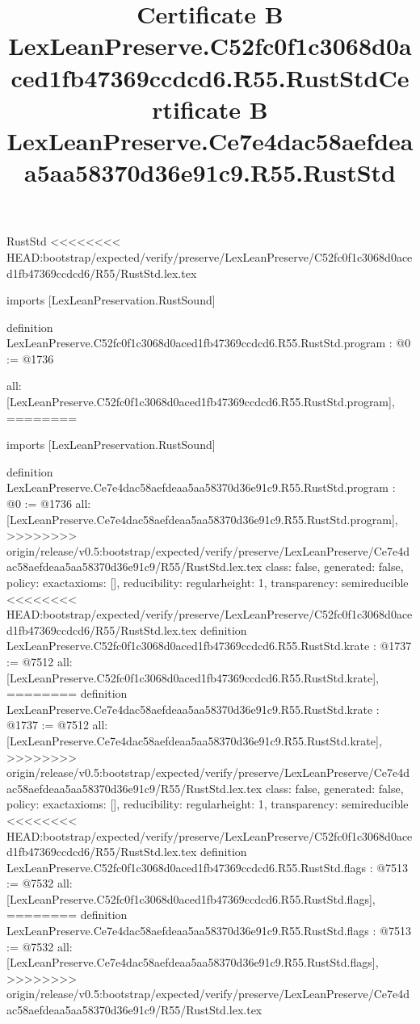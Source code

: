 \begin{lexlean}{RustStd}
<<<<<<<< HEAD:bootstrap/expected/verify/preserve/LexLeanPreserve/C52fc0f1c3068d0aced1fb47369ccdcd6/R55/RustStd.lex.tex
\title{Certificate B LexLeanPreserve.C52fc0f1c3068d0aced1fb47369ccdcd6.R55.RustStd}
\begin{coremodule}
imports [LexLeanPreservation.RustSound]

definition LexLeanPreserve.C52fc0f1c3068d0aced1fb47369ccdcd6.R55.RustStd.program : @0 := @1736 {
  all: [LexLeanPreserve.C52fc0f1c3068d0aced1fb47369ccdcd6.R55.RustStd.program],
========
\title{Certificate B LexLeanPreserve.Ce7e4dac58aefdeaa5aa58370d36e91c9.R55.RustStd}
\begin{coremodule}
imports [LexLeanPreservation.RustSound]

definition LexLeanPreserve.Ce7e4dac58aefdeaa5aa58370d36e91c9.R55.RustStd.program : @0 := @1736 {
  all: [LexLeanPreserve.Ce7e4dac58aefdeaa5aa58370d36e91c9.R55.RustStd.program],
>>>>>>>> origin/release/v0.5:bootstrap/expected/verify/preserve/LexLeanPreserve/Ce7e4dac58aefdeaa5aa58370d36e91c9/R55/RustStd.lex.tex
  class: false,
  generated: false,
  policy: exact{axioms: []},
  reducibility: regular{height: 1},
  transparency: semireducible
}
<<<<<<<< HEAD:bootstrap/expected/verify/preserve/LexLeanPreserve/C52fc0f1c3068d0aced1fb47369ccdcd6/R55/RustStd.lex.tex
definition LexLeanPreserve.C52fc0f1c3068d0aced1fb47369ccdcd6.R55.RustStd.krate : @1737 := @7512 {
  all: [LexLeanPreserve.C52fc0f1c3068d0aced1fb47369ccdcd6.R55.RustStd.krate],
========
definition LexLeanPreserve.Ce7e4dac58aefdeaa5aa58370d36e91c9.R55.RustStd.krate : @1737 := @7512 {
  all: [LexLeanPreserve.Ce7e4dac58aefdeaa5aa58370d36e91c9.R55.RustStd.krate],
>>>>>>>> origin/release/v0.5:bootstrap/expected/verify/preserve/LexLeanPreserve/Ce7e4dac58aefdeaa5aa58370d36e91c9/R55/RustStd.lex.tex
  class: false,
  generated: false,
  policy: exact{axioms: []},
  reducibility: regular{height: 1},
  transparency: semireducible
}
<<<<<<<< HEAD:bootstrap/expected/verify/preserve/LexLeanPreserve/C52fc0f1c3068d0aced1fb47369ccdcd6/R55/RustStd.lex.tex
definition LexLeanPreserve.C52fc0f1c3068d0aced1fb47369ccdcd6.R55.RustStd.flags : @7513 := @7532 {
  all: [LexLeanPreserve.C52fc0f1c3068d0aced1fb47369ccdcd6.R55.RustStd.flags],
========
definition LexLeanPreserve.Ce7e4dac58aefdeaa5aa58370d36e91c9.R55.RustStd.flags : @7513 := @7532 {
  all: [LexLeanPreserve.Ce7e4dac58aefdeaa5aa58370d36e91c9.R55.RustStd.flags],
>>>>>>>> origin/release/v0.5:bootstrap/expected/verify/preserve/LexLeanPreserve/Ce7e4dac58aefdeaa5aa58370d36e91c9/R55/RustStd.lex.tex
}}}
\end{coremodule}}
\end{coremodule}
\end{lexlean}
